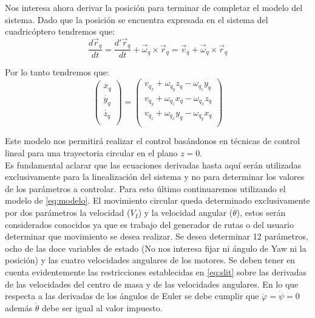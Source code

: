 \documentclass[main]{subfiles}
\begin{document}
Nos interesa ahora derivar la posici\'on para terminar de completar el modelo del sistema. Dado que la posici\'on se encuentra expresada en el sistema del cuadric\'optero tendremos que:
\begin{equation}
\frac{d\vec{r}_q}{dt}=\frac{d\prime\vec{r}_q}{dt}+\vec{\omega}_q \times \vec{r}_q=\vec{v}_q+\vec{\omega}_q \times \vec{r}_q
\end{equation}

Por lo tanto tendremos que:
\begin{equation}
\label{eq:MVEcirc}
\left(\begin{array}{c}
\dot{x_q}\\
\dot{y_q}\\
\dot{z_q}\\
\end{array}\right)=\left(\begin{array}{c}
v_{q_x}+\omega_{q_y}z_q-\omega_{q_z}y_q\\
v_{q_y}+\omega_{q_z}x_q-\omega_{q_x}z_q\\
v_{q_z}+\omega_{q_x}y_q-\omega_{q_y}x_q\\
\end{array}\right)
\end{equation}

Este modelo nos permitir\'a realizar el control bas\'andonos en t\'ecnicas de control lineal para una trayectoria circular en el plano $z=0$.\\

Es fundamental aclarar que las ecuaciones derivadas hasta aqu\'i ser\'an utilizadas exclusivamente para la linealizaci\'on del sistema y no para determinar los valores de los par\'ametros a controlar. Para esto \'ultimo continuaremos utilizando el modelo de \ref{eq:modelo}. El movimiento circular queda determinado exclusivamente por dos par\'ametros la velocidad ($V_I$) y la velocidad angular ($\dot{\theta}$), estos ser\'an considerados conocidos ya que es trabajo del generador de rutas o del usuario determinar que movimiento se desea realizar. Se desea determinar 12 par\'ametros, ocho de las doce variables de estado (No nos interesa fijar ni \'angulo de Yaw ni la posici\'on) y las cuatro velocidades angulares de los motores.  Se deben tener en cuenta evidentemente las restricciones establecidas en \ref{eq:slit} sobre las derivadas de las velocidades del centro de masa y de las velocidades angulares. En lo que respecta a las derivadas de los \'angulos de Euler se debe cumplir que $\dot{\varphi}=\dot{\psi}=0$ adem\'as $\dot{\theta}$ debe ser igual al valor impuesto. 
\end{document}
